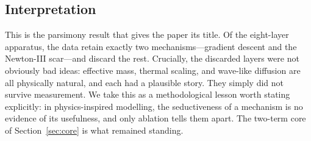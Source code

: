 \subsection{Interpretation}

This is the parsimony result that gives the paper its title. Of the eight-layer
apparatus, the data retain exactly two mechanisms---gradient descent and the
Newton-III scar---and discard the rest. Crucially, the discarded layers were not
obviously bad ideas: effective mass, thermal scaling, and wave-like diffusion
are all physically natural, and each had a plausible story. They simply did not
survive measurement. We take this as a methodological lesson worth stating
explicitly: in physics-inspired modelling, the seductiveness of a mechanism is
no evidence of its usefulness, and only ablation tells them apart. The two-term
core of Section~\ref{sec:core} is what remained standing.
